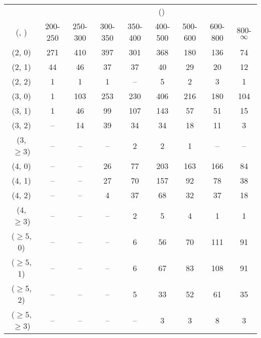 \begin{table}[h!]
\tiny
\centering
{}
\begin{tabular}
{ccccccccc}
	\hline\hline
&	& \multicolumn{8}{c}{\scalht (\gev)} \\ 
	 (\njet,  \nb) & 200-250 & 250-300 & 300-350 & 350-400 & 400-500 & 500-600 & 600-800 & 800-$\infty$ \\ [0.8ex] 
\hline
	(2, 0) & 271 & 410 & 397 & 301 & 368 & 180 & 136 & 74 \\[0.5ex] 
	(2, 1) & 44 & 46 & 37 & 37 & 40 & 29 & 20 & 12 \\[0.5ex] 
	(2, 2) & 1 & 1 & 1 & -- & 5 & 2 & 3 & 1 \\[0.5ex] 
	(3, 0) & 1 & 103 & 253 & 230 & 406 & 216 & 180 & 104 \\[0.5ex] 
	(3, 1) & 1 & 46 & 99 & 107 & 143 & 57 & 51 & 15 \\[0.5ex] 
	(3, 2) & -- & 14 & 39 & 34 & 34 & 18 & 11 & 3 \\[0.5ex] 
	(3, $\ge3$) & -- & -- & -- & 2 & 2 & 1 & -- & -- \\[0.5ex] 
	(4, 0) & -- & -- & 26 & 77 & 203 & 163 & 166 & 84 \\[0.5ex] 
	(4, 1) & -- & -- & 27 & 70 & 157 & 92 & 78 & 38 \\[0.5ex] 
	(4, 2) & -- & -- & 4 & 37 & 68 & 32 & 37 & 18 \\[0.5ex] 
	(4, $\ge3$) & -- & -- & -- & 2 & 5 & 4 & 1 & 1 \\[0.5ex] 
	($\ge5$, 0) & -- & -- & -- & 6 & 56 & 70 & 111 & 91 \\[0.5ex] 
	($\ge5$, 1) & -- & -- & -- & 6 & 67 & 83 & 108 & 91 \\[0.5ex] 
	($\ge5$, 2) & -- & -- & -- & 5 & 33 & 52 & 61 & 35 \\[0.5ex] 
	($\ge5$, $\ge3$) & -- & -- & -- & -- & 3 & 3 & 8 & 3 \\[0.5ex] 
	\hline
	\hline
\end{tabular}
\end{table}
